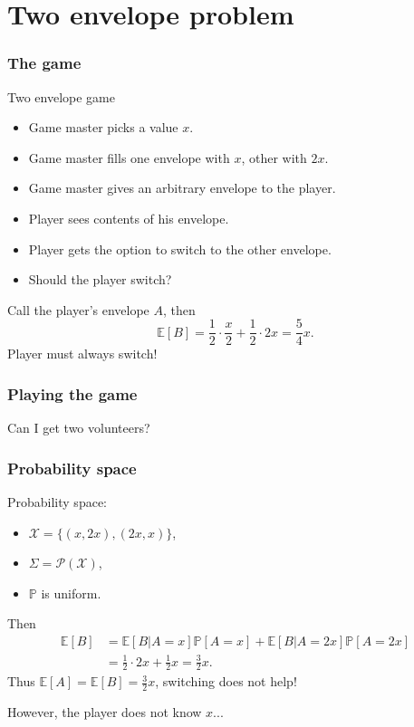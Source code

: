 \documentclass{beamer}
\theoremstyle{plain}
\theoremstyle{definition}
\theoremstyle{remark}
\renewcommand{\P}{\mathbb{P}}
\newcommand{\E}{\mathbb{E}}
\newcommand{\1}{\mathbbm{1}}
\begin{document}
\section{Two envelope problem}
\begin{frame}
\frametitle{The game}

\begin{exampleblock}{Two envelope game}
\begin{itemize}
	\item Game master picks a value $x$.
	\item Game master fills one envelope with $x$, other with $2x$.
	\item Game master gives an arbitrary envelope to the player.
	\item Player sees contents of his envelope.
	\item Player gets the option to switch to the other envelope.
	\item Should the player switch?
\end{itemize}
\end{exampleblock}
\pause
Call the player's envelope $A$, then
\[\E[B]=\frac{1}{2}\cdot \frac{x}{2}+\frac{1}{2}\cdot 2x=\frac{5}{4}x.\]
Player must always switch!

\end{frame}

\begin{frame}
\frametitle{Playing the game}

Can I get two volunteers?
\end{frame}

\begin{frame}
\frametitle{Probability space}
Probability space:
\begin{itemize}
	\item $\mathcal{X}=\{(x,2x),(2x,x)\}$,
	\item $\Sigma=\mathcal{P}(\mathcal{X})$,
	\item $\P$ is uniform.
\end{itemize}

Then 
\begin{align*}
\E[B]&=\E[B|A=x]\P[A=x]+\E[B|A=2x]\P[A=2x]\\
&=\frac{1}{2}\cdot2x+\frac{1}{2}x=\frac{3}{2}x.
\end{align*}
\pause
Thus $\E[A]=\E[B]=\frac{3}{2}x$, switching does not help!

However, the player does not know $x$...
\end{frame}
\end{document}
